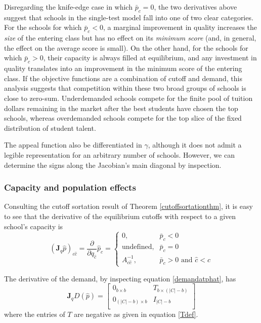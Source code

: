 \documentclass[12pt]{article}
\theoremstyle{definition}
\begin{document}
Disregarding the knife-edge case in which $\bar p_c = 0$, the two derivatives above suggest that schools in the single-test model fall into one of two clear categories. For the schools for which $\bar p_c < 0$, a marginal improvement in quality increases the \emph{size} of the entering class but has no effect on its \emph{minimum score} (and, in general, the effect on the average score is small). On the other hand, for the schools for which $\bar p_c > 0$, their capacity is always filled at equilibrium, and any investment in quality translates into an improvement in the minimum score of the entering class. If the objective functions are a combination of cutoff and demand, this analysis suggests that competition within these two broad groups of schools is close to zero-sum. Underdemanded schools compete for the finite pool of tuition dollars remaining in the market after the best students have chosen the top schools, whereas overdemanded schools compete for the top slice of the fixed distribution of student talent.

The appeal function also be differentiated in $\gamma$, although it does not admit a legible representation for an arbitrary number of schools. However, we can determine the signs along the Jacobian's main diagonal by inspection.


\subsubsection{Capacity and population effects}
Consulting the cutoff sortation result of Theorem \ref{cutoffsortationthm}, it is easy to see that the derivative of the equilibrium cutoffs with respect to a given school's capacity is
\begin{equation}\label{jac-q-p}
\left(\mathbf{J}_q \hat p\right)_{c\hat c} =
\frac{\partial}{\partial q_{\hat c}} \hat p_c = \begin{cases}
0, & \bar p_c < 0 \\
\text{undefined}, & \bar p_c = 0 \\
A^{-1}_{c \hat c}, & \bar p_c > 0 \text{ and }\hat c < c 
\end{cases}
\end{equation}

The derivative of the demand, by inspecting equation \eqref{demandatphat}, has
\begin{equation}\mathbf{J}_q D(\hat p) =
\begin{bmatrix}
0_{b \times b} & T_{b \times (|C| - b)} \\
0_{(|C| - b) \times b} & I_{|C| - b} \\
\end{bmatrix} 
\end{equation}
where the entries of $T$ are negative as given in equation \eqref{Tdef}.
\end{document}
